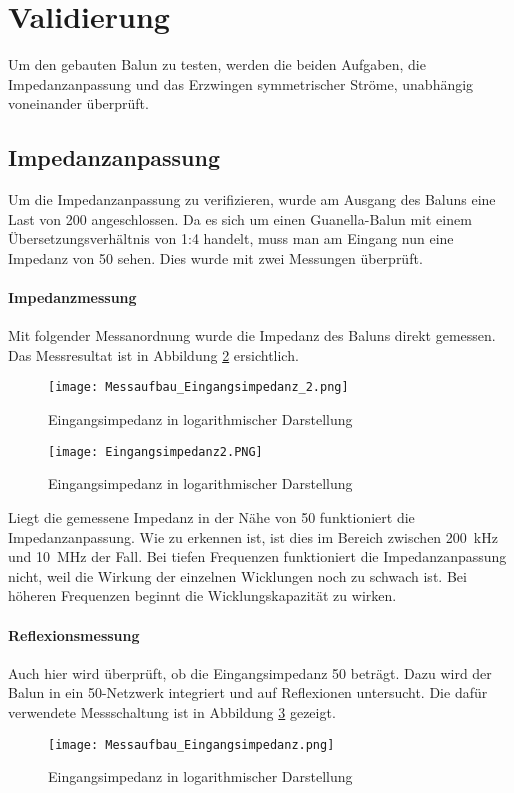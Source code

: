 \section{Validierung}
Um den gebauten Balun zu testen, werden die beiden Aufgaben, die Impedanzanpassung und das Erzwingen symmetrischer Ströme, unabhängig voneinander überprüft.
\subsection{Impedanzanpassung}
Um die Impedanzanpassung zu verifizieren, wurde am Ausgang des Baluns eine Last von \SI{200}{\Omega} angeschlossen. Da es sich um einen Guanella-Balun mit einem Übersetzungsverhältnis von 1:4 handelt, muss man am Eingang nun eine Impedanz von \SI{50}{\Omega} sehen. Dies wurde mit zwei Messungen überprüft.

\paragraph{Impedanzmessung}
Mit folgender Messanordnung wurde die Impedanz des Baluns direkt gemessen. Das Messresultat ist in Abbildung \ref{fig:Eingangsimpedanz2} ersichtlich.
\begin{figure}[H]
	\centering
	\texttt{[image: Messaufbau\_Eingangsimpedanz\_2.png]}
	\caption{Eingangsimpedanz in logarithmischer Darstellung}\label{fig:mess_eingangsimpedanz2}
\end{figure}

\begin{figure}[H]
	\centering
	\texttt{[image: Eingangsimpedanz2.PNG]}
	\caption{Eingangsimpedanz in logarithmischer Darstellung}\label{fig:Eingangsimpedanz2}
\end{figure}
Liegt die gemessene Impedanz in der Nähe von \SI{50}{\Omega} funktioniert die Impedanzanpassung. Wie zu erkennen ist, ist dies im Bereich zwischen \SI{200}{kHz} und \SI{10}{MHz} der Fall. Bei tiefen Frequenzen funktioniert die Impedanzanpassung nicht, weil die Wirkung der einzelnen Wicklungen noch zu schwach ist. Bei höheren Frequenzen beginnt die Wicklungskapazität zu wirken.

\paragraph{Reflexionsmessung}
Auch hier wird überprüft, ob die Eingangsimpedanz \SI{50}{\Omega} beträgt. Dazu wird der Balun in ein \SI{50}{\Omega}-Netzwerk integriert und auf Reflexionen untersucht. Die dafür verwendete Messschaltung ist in Abbildung \ref{fig:mess_eingangsimpedanz} gezeigt.
\begin{figure}[H]
	\centering
	\texttt{[image: Messaufbau\_Eingangsimpedanz.png]}
	\caption{Eingangsimpedanz in logarithmischer Darstellung}\label{fig:mess_eingangsimpedanz}
\end{figure}

